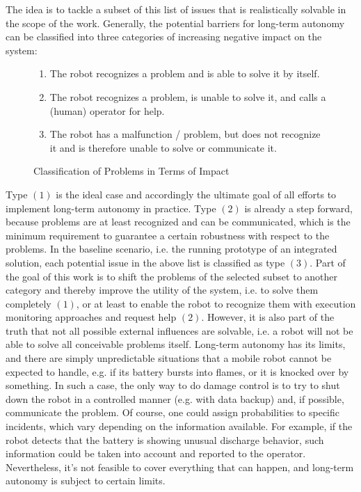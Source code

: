 \documentclass[english, master, utf8]{base/thesis_KBS}
\begin{document}
\noindent
The idea is to tackle a subset of this list of issues that is realistically solvable in the scope of the work.
Generally, the potential barriers for long-term autonomy can be classified into three categories of increasing negative impact on the system:
\begin{figure}[H]
\centering
\begin{enumerate}
    \item The robot recognizes a problem and is able to solve it by itself.
    \item The robot recognizes a problem, is unable to solve it, and calls a (human) operator for help.
    \item The robot has a malfunction / problem, but does not recognize it and is therefore unable to solve or communicate it.
\end{enumerate}
\caption{Classification of Problems in Terms of Impact}
\label{fig:problem_types}
\end{figure}
Type $(1)$ is the ideal case and accordingly the ultimate goal of all efforts to implement long-term autonomy in practice. Type $(2)$ is already a step forward, because problems
are at least recognized and can be communicated, which is the minimum requirement to guarantee a certain robustness with respect to the problems.
In the baseline scenario, i.e. the running prototype of an integrated solution, each potential issue in the above list is classified as type $(3)$.
Part of the goal of this work is to shift the problems of the selected subset to another category and thereby improve the utility of the system, 
i.e. to solve them completely $(1)$, or at least to enable the robot to recognize them with execution monitoring approaches and request help $(2)$.
However, it is also part of the truth that not all possible external influences are solvable, i.e. a robot will not be able to solve all
conceivable problems itself. Long-term autonomy has its limits, and there are simply unpredictable situations that a mobile robot cannot be expected to handle,
e.g. if its battery bursts into flames, or it is knocked over by something. In such a case, the only way to do damage control is to try to shut down the 
robot in a controlled manner (e.g. with data backup) and, if possible, communicate the problem.
Of course, one could assign probabilities to specific incidents, which vary depending on the information available. 
For example, if the robot detects that the battery is showing unusual discharge behavior, such information could be taken into account and 
reported to the operator. Nevertheless, it's not feasible to cover everything that can happen, and long-term autonomy is subject to certain limits.
\end{document}
